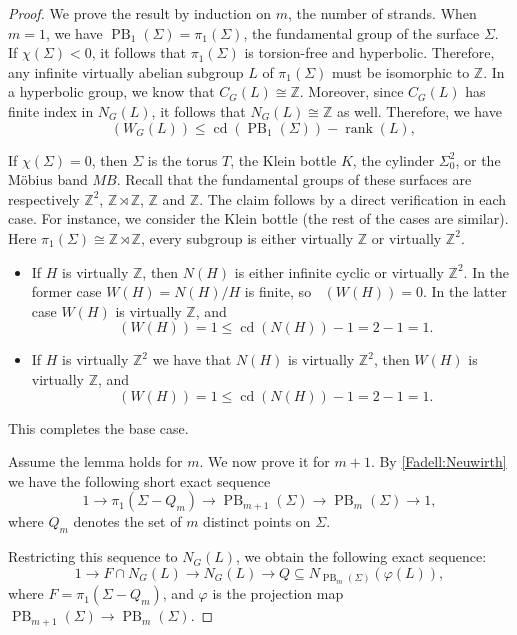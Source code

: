 \documentclass[a4paper,12pt,leqno]{amsart}
\theoremstyle{definition}
\newcommand{\Z}{\mathbb{Z}}
\newcommand{\calF}{{\mathcal F}}
\DeclareMathOperator{\cd}{cd}
\DeclareMathOperator{\gdfin}{gd_{\calF_0}}
\DeclareMathOperator{\pb}{PB}
\DeclareMathOperator{\rank}{rank}
\begin{document}
\begin{proof}
We prove the result by induction on \( m \), the number of strands. When \( m = 1 \), we have \( \pb_1(\Sigma) = \pi_1(\Sigma) \), the fundamental group of the surface \( \Sigma \). If \( \chi(\Sigma) < 0 \), it follows that \( \pi_1(\Sigma) \) is torsion-free and hyperbolic. Therefore, any infinite virtually abelian subgroup \( L \) of \( \pi_1(\Sigma) \) must be isomorphic to \( \mathbb{Z} \). In a hyperbolic group, we know that \( C_G(L) \cong \mathbb{Z} \). Moreover, since \( C_G(L) \) has finite index in \( N_G(L) \), it follows that \( N_G(L) \cong \mathbb{Z} \) as well. Therefore, we have
\[
\gdfin(W_G(L)) \leq \cd(\pb_1(\Sigma)) - \rank(L),
\]

If $\chi(\Sigma) = 0$, then $\Sigma$ is the torus $T$, the Klein bottle $K$, 
the cylinder $\Sigma_0^2$, or the Möbius band $MB$. Recall that the fundamental groups of these surfaces are respectively $\mathbb{Z}^2$, $\mathbb{Z} \rtimes \mathbb{Z}$, $\mathbb{Z}$ and $\mathbb{Z}$. 
The claim follows by a direct verification in each case. For instance, we consider the Klein bottle (the rest of the cases are similar). Here 
$\pi_1(\Sigma) \cong \mathbb{Z} \rtimes \mathbb{Z}$, every subgroup is either 
virtually $\mathbb{Z}$ or virtually $\mathbb{Z}^2$.

\begin{itemize}
    \item If $H$ is virtually $\mathbb{Z}$, 
then $N(H)$ is either infinite cyclic or virtually $\mathbb{Z}^2$. In the former 
case $W(H) = N(H)/H$ is finite, so $\gdfin(W(H)) = 0$. In the latter case 
$W(H)$ is virtually $\mathbb{Z}$, and
\[
\gdfin(W(H)) = 1 \leq \cd(N(H)) - 1 = 2 - 1 = 1.
\]


\item If $H$ is virtually $\Z^2$ we have that $N(H)$ is virtually $\Z^2$, then $W(H)$ is virtually $\Z$, and
\[
\gdfin(W(H)) = 1 \leq \cd(N(H)) - 1 = 2 - 1 = 1.
\]
\end{itemize}
This completes the base case. 

Assume the lemma holds for \( m \). We now prove it for \( m + 1 \). By \cref{Fadell:Neuwirth} we have the following short exact sequence
\[
1 \to \pi_1(\Sigma - Q_m) \to \pb_{m+1}(\Sigma) \to \pb_m(\Sigma) \to 1,
\]
where \( Q_m \) denotes the set of \( m \) distinct points on \( \Sigma \).

Restricting this sequence to \( N_G(L) \), we obtain the following exact sequence:
\[
1 \to F \cap N_G(L) \to N_G(L) \to Q\subseteq N_{\pb_m(\Sigma)}(\varphi(L)) ,
\]
where \( F = \pi_1(\Sigma - Q_m) \), and \( \varphi \) is the projection map \( \pb_{m+1}(\Sigma) \to \pb_m(\Sigma) \).


\end{proof}
\end{document}
